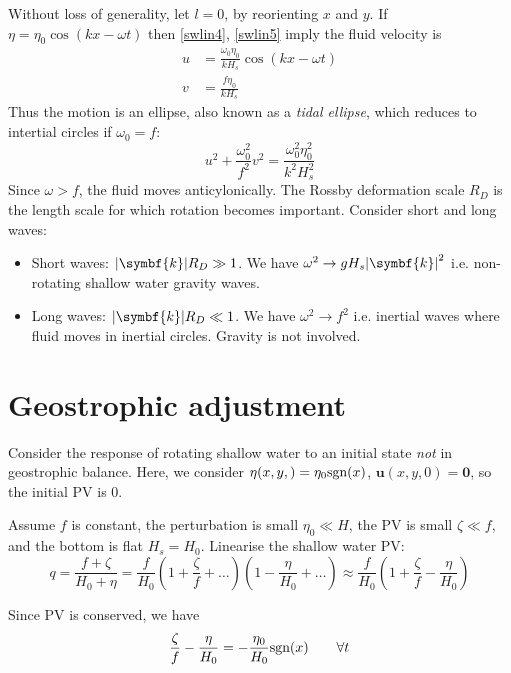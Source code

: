 \documentclass{jknotes}
\begin{document}
Without loss of generality, let $l = 0$, by reorienting $x$ and $y$. If $\eta
= \eta_0 \cos(kx-\omega t)$ then \eqref{swlin4}, \eqref{swlin5} imply the
fluid velocity is
\begin{align}
	u &= \frac{\omega_0 \eta_0}{k H_s} \cos(kx-\omega t) \\
	v &= \frac{f \eta_0}{k H_s}
\end{align}
Thus the motion is an ellipse, also known as a \emph{tidal ellipse}, which
reduces to intertial circles if $\omega_0 = f$:
\begin{equation}
	u^2 + \frac{\omega_0^2}{f^2} v^2 = \frac{\omega_0^2 \eta_0^2}{k^2 H_s^2}
\end{equation}
Since $\omega > f$, the fluid moves anticylonically. The Rossby deformation
scale $R_D$ is the length scale for which rotation becomes important. Consider
short and long waves:
\begin{itemize}
	\item Short waves: $\abs{\symbf{k}} R_D \gg 1$. We have $\omega^2 \to g H_s
		\abs{\symbf{k}}^2$ i.e. non-rotating shallow water gravity waves.
	\item Long waves: $\abs{\symbf{k}}R_D \ll 1$. We have $\omega^2 \to f^2$ i.e.
		inertial waves where fluid moves in inertial circles. Gravity is not
		involved.
\end{itemize}

\section{Geostrophic adjustment}
Consider the response of rotating shallow water to an initial state \emph{not}
in geostrophic balance. Here, we consider $\eta(x,y,) = \eta_0 \text{sgn}(x)$,
$\symbf{u}(x,y,0) = \symbf{0}$, so the initial PV is $0$. 


Assume $f$ is constant, the perturbation is small $\eta_0 \ll H$, the PV is
small $\zeta \ll f$, and the bottom is flat $H_s = H_0$. Linearise the shallow
water PV:
\begin{equation}
	q = \frac{f+\zeta}{H_0+\eta} = \frac{f}{H_0}\left(1+\frac{\zeta}{f} +
		\dots\right)\left(1-\frac{\eta}{H_0}+\dots\right) \approx
		\frac{f}{H_0}\left(1+\frac{\zeta}{f} - \frac{\eta}{H_0}\right)
\end{equation}

Since PV is conserved, we have
\begin{equation}
	\frac{\zeta}{f} - \frac{\eta}{H_0} = -\frac{\eta_0}{H_0} \text{sgn}(x)
	\hspace{2em} \forall t \label{eq:PVcons}
\end{equation}
\end{document}
